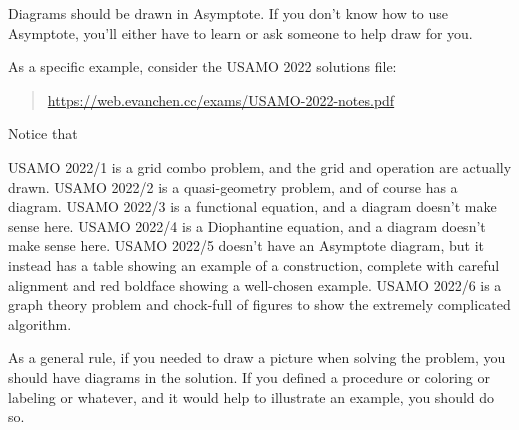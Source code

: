 \documentclass[11pt]{scrartcl}
\begin{document}
\alert{Diagrams should be drawn in Asymptote}.
If you don't know how to use Asymptote,
you'll either have to learn or ask someone to help draw for you.

As a specific example, consider the USAMO 2022 solutions file:
\begin{quote}
  \url{https://web.evanchen.cc/exams/USAMO-2022-notes.pdf}
\end{quote}
Notice that
\begin{itemize}
  \ii USAMO 2022/1 is a grid combo problem, and the grid and operation are
  actually drawn.
  \ii USAMO 2022/2 is a quasi-geometry problem, and of course has a diagram.
  \ii USAMO 2022/3 is a functional equation, and a diagram doesn't make sense here.
  \ii USAMO 2022/4 is a Diophantine equation, and a diagram doesn't make sense here.
  \ii USAMO 2022/5 doesn't have an Asymptote diagram,
  but it instead has a table showing an example of a construction,
  complete with careful alignment and red boldface showing a well-chosen example.
  \ii USAMO 2022/6 is a graph theory problem and chock-full of figures
  to show the extremely complicated algorithm.
\end{itemize}

As a general rule, if you needed to draw a picture when solving the problem,
you should have diagrams in the solution.
If you defined a procedure or coloring or labeling or whatever,
and it would help to illustrate an example, you should do so.
\end{document}
